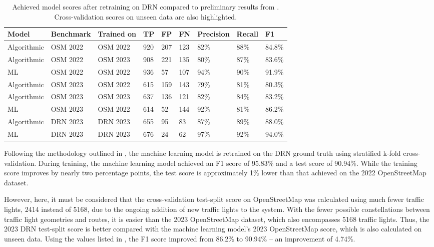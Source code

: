 \begin{table}[b]
\caption{Achieved model scores after retraining on DRN compared to preliminary results from . Cross-validation scores on unseen data are also highlighted.}
\begin{tabular}{@{}lllllllll@{}}
\toprule
  \textbf{Model} & \textbf{Benchmark} & \textbf{Trained on} & \textbf{TP} & \textbf{FP} & \textbf{FN} & \textbf{Precision} & \textbf{Recall} & \textbf{F1} \\
  \midrule
  Algorithmic & OSM 2022 & OSM 2022 & 920 & 207 & 123 & 82\% & 88\% & 84.8\% \\
  Algorithmic & OSM 2022 & OSM 2023 & 908 & 221 & 135 & 80\% & 87\% & 83.6\% \\
  ML          & OSM 2022 & OSM 2022 & 936 & 57 & 107 & 94\% & 90\% & 91.9\% \\
  \midrule
  Algorithmic & OSM 2023 & OSM 2022 & 615 & 159 & 143 & 79\% & 81\% & 80.3\% \\
  Algorithmic & OSM 2023 & OSM 2023 & 637 & 136 & 121 & 82\% & 84\% & 83.2\% \\
  ML          & OSM 2023 & OSM 2022 & 614 & 52 & 144 & 92\% & 81\% & 86.2\% \\
  \midrule
  Algorithmic & DRN 2023 & DRN 2023 & 655 & 95 & 83 & 87\% & 89\% & 88.0\% \\
  ML          & DRN 2023 & DRN 2023 & 676 & 24 & 62 & 97\% & 92\% & 94.0\% \\
\bottomrule
\end{tabular}
\label{tab:model-scores-drn}
\end{table}

Following the methodology outlined in , the machine learning model is retrained on the DRN ground truth using stratified k-fold cross-validation. During training, the machine learning model achieved an F1 score of 95.83\% and a test score of 90.94\%. While the training score improves by nearly two percentage points, the test score is approximately 1\% lower than that achieved on the 2022 OpenStreetMap dataset. 

However, here, it must be considered that the cross-validation test-split score on OpenStreetMap was calculated using much fewer traffic lights, 2414 instead of 5168, due to the ongoing addition of new traffic lights to the system. With the fewer possible constellations between traffic light geometries and routes, it is easier than the 2023 OpenStreetMap dataset, which also encompasses 5168 traffic lights. Thus, the 2023 DRN test-split score is better compared with the machine learning model's 2023 OpenStreetMap score, which is also calculated on unseen data. Using the values listed in , the F1 score improved from 86.2\% to 90.94\% -- an improvement of 4.74\%. 

